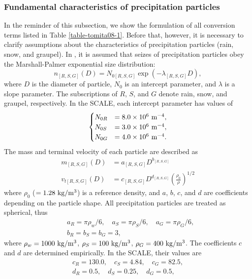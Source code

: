 \subsubsection{Fundamental characteristics of precipitation particles}
In the reminder of this subsection, we show the formulation of all conversion terms listed in Table \ref{table-tomita08-1}. Before that, however, it is necessary to clarify assumptions about the characteristics of precipitation particles (rain, snow, and graupel). In \citet{tomita_2008}, it is assumed that seizes of precipitation particles obey the Marshall-Palmer exponential size distribution:
\begin{equation}
  n_{[R,S,G]}(D) = N_{0[R,S,G]}\exp(-\lambda_{[R,S,G]}D)\label{eq:size_dist},
\end{equation}
where $D$ is the diameter of particle, $N_{0}$ is an intercept parameter, and $\lambda$ is a slope parameter. The subscriptions of $R$, $S$, and $G$ denote rain, snow, and graupel, respectively. In the SCALE, each intercept parameter has values of
\begin{align}
\begin{cases}
  N_{0R}&=8.0\times 10^{6}{\rm \ m^{-4}}, \\ 
  N_{0S}&=3.0\times 10^{6}{\rm \ m^{-4}}, \\ 
  N_{0G}&=4.0\times 10^{6}{\rm \ m^{-4}}.
\end{cases}
\end{align}
The mass and terminal velocity of each particle are described as
\begin{align}
  m_{[R,S,G]}(D) &= a_{[R,S,G]}D^{b_{[R,S,G]}}\label{eq:particle_mass} \\
  v_{t[R,S,G]}(D) &= c_{[R,S,G]}D^{d_{[R,S,G]}}\left(\frac{\rho_{0}}{\rho}\right)^{1/2}
\end{align}
where $\rho_{0}$ ($=1.28\rm \ kg/m^{3}$) is a reference density, and $a$, $b$, $c$, and $d$ are coefficients depending on the particle shape. All precipitation particles are treated as spherical, thus
\begin{align}
  &a_{R}=\pi \rho_{w}/6,\quad a_{S}=\pi \rho_{S}/6,\quad a_{G}=\pi \rho_{G}/6, \\
  &b_{R}=b_{S}=b_{G}=3,
\end{align}
where $\rho_{w}=1000 {\rm \ kg/m^{3}}$, $\rho_{S}=100 {\rm \ kg/m^{3}}$, $\rho_{G}=400 {\rm \ kg/m^{3}}$. The coefficients $c$ and $d$ are determined empirically. In the SCALE, their values are
\begin{align}
  c_{R}=130.0,\quad c_{S}=4.84,\quad c_{G}=82.5, \\
  d_{R}=0.5,\quad d_{S}=0.25,\quad d_{G}=0.5,
\end{align}
